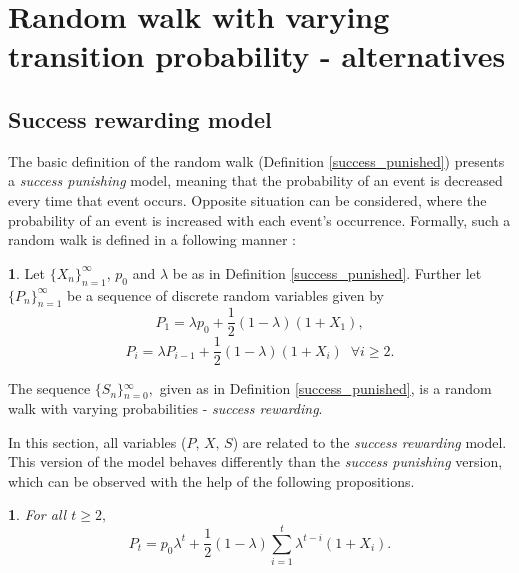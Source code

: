 \documentclass{amsart}
\theoremstyle{definition}
\newtheorem{defn}[thm]{\protect\definitionname}
\theoremstyle{plain}
\newtheorem{prop}[thm]{\protect\propositionname}
\theoremstyle{plain}
\theoremstyle{plain}
\numberwithin{equation}{section}
\providecommand{\definitionname}{Definition}
\providecommand{\propositionname}{Proposition}
\begin{document}
\section{Random walk with varying transition probability - alternatives\label{sec:Random-walk-aternatives}}

\subsection{Success rewarding model}

The basic definition of the random walk (Definition \ref{success_punished})
presents a \emph{success punishing} model, meaning that the probability
of an event is decreased every time that event occurs. Opposite situation
can be considered, where the probability of an event is increased
with each event's occurrence. Formally, such a random walk is defined
in a following manner \cite{ja2019teze}:

\begin{defn}
\label{succes_rewarded}Let ${\{X_{n}\}}_{n=1}^{\infty}$, $p_{0}$
and $\lambda$ be as in Definition \ref{success_punished}. Further
let ${\{P_{n}\}}_{n=1}^{\infty}$ be a sequence of discrete random
variables given by
\begin{equation}
P_{1}=\lambda p_{0}+\frac{1}{2}(1-\lambda)(1+X_{1}),\label{eq:P1_def-reward}
\end{equation}
\begin{equation}
P_{i}=\lambda P_{i-1}+\frac{1}{2}(1-\lambda)(1+X_{i})\;\;\forall i\geq2.\label{eq:Pi_def-reward}
\end{equation}

The sequence ${\{S_{n}\}}{}_{n=0}^{\infty},$ given as in Definition \ref{success_punished}, is a random walk with varying probabilities - \emph{success
rewarding}.
\end{defn}
In this section, all variables ($P,\,X,\,S$) are related to the
\emph{success rewarding} model. This version of the model behaves differently
than the \emph{success punishing} version, which can be observed with
the help of the following propositions.

\begin{prop}
For all $t\ge 2,$
\begin{equation}
P_{t}=p_{0}\lambda^{t}+\frac{1}{2}(1-\lambda)\sum_{i=1}^{t}\lambda^{t-i}(1+X_{i}).\label{eq:propSuccess1}
\end{equation}
\end{prop}
\end{document}
